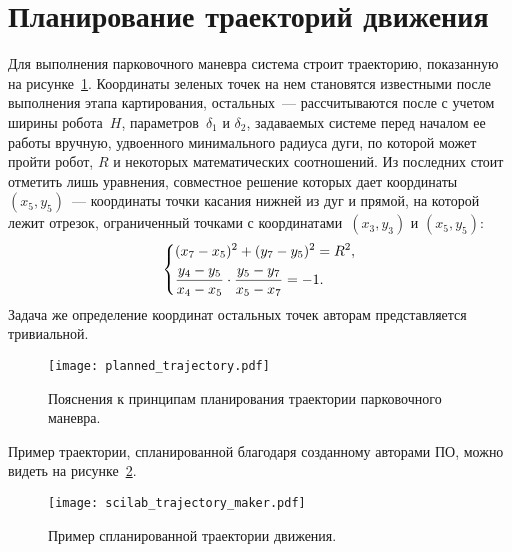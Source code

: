 \newpage
\section{Планирование траекторий движения}
Для выполнения парковочного маневра система строит траекторию, показанную на рисунке~\ref{img_planned_trajectory}.
Координаты зеленых точек на нем становятся известными после выполнения этапа картирования, остальных~--- рассчитываются после с учетом ширины робота~$H$, параметров~$\delta_1$ и $\delta_2$, задаваемых системе перед началом ее работы вручную, удвоенного минимального радиуса дуги, по которой может пройти робот, $R$ и некоторых математических соотношений.
Из последних стоит отметить лишь уравнения, совместное решение которых дает координаты $(x_5, y_5)$~--- координаты точки касания нижней из дуг и прямой, на которой лежит отрезок, ограниченный точками с координатами~$(x_3, y_3)$ и $(x_5, y_5)$:
\begin{equation}
    \left\{
    \begin{aligned}
        & (x_7 - x_5)^2 + (y_7 - y_5)^2 = R^2, \\
        & \frac{y_4 - y_5}{x_4 - x_5} \cdot \frac{y_5 - y_7}{x_5 - x_7} = -1 \ldotp
    \end{aligned}
    \right.
\end{equation}
Задача же определение координат остальных точек авторам представляется тривиальной.

\begin{figure}[h!]
    \centering
    \texttt{[image: planned\_trajectory.pdf]}
    \vspace{0cm}
    \caption{Пояснения к принципам планирования траектории парковочного маневра.}
    \label{img_planned_trajectory}
\end{figure}

Пример траектории, спланированной благодаря созданному авторами ПО, можно видеть на рисунке~\ref{img_scilab_trajectory_maker}.

\begin{figure}[h!]
    \centering
    \texttt{[image: scilab\_trajectory\_maker.pdf]}
    \caption{Пример спланированной траектории движения.}
    \label{img_scilab_trajectory_maker}
\end{figure}

\newpage \mbox{} \newpage